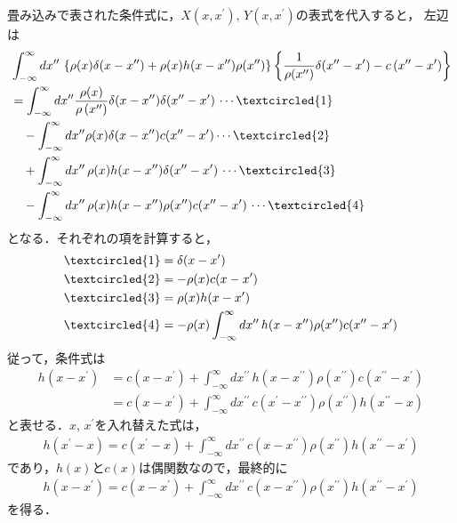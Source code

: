 \noindent
畳み込みで表された条件式に，$X\left(x,x^{\prime}\right)$, $Y\left(x,x^{\prime}\right)$の表式を代入すると，
左辺は
\begin{align*}
 &\int_{-\infty}^{\infty} dx^{\prime\prime}\,\left\{\rho(x)\delta(x-x^{\prime\prime})+\rho(x)h(x-x^{\prime\prime})\rho(x^{\prime\prime})\right\}\left\{\dfrac{1}{\rho(x^{\prime\prime})}\delta(x^{\prime\prime}-x^{\prime}) - c\left(x^{\prime\prime}-x^{\prime}\right)\right\} \notag \\
 & = \int_{-\infty}^{\infty}dx^{\prime\prime} \dfrac{\rho(x)}{\rho\left(x^{\prime\prime}\right)}\delta(x-x^{\prime\prime})\delta(x^{\prime\prime}-x^{\prime}) \,\cdots \textcircled{1}\notag \\ 
 & \quad - \int_{-\infty}^{\infty}dx^{\prime\prime}\rho(x)\delta(x-x^{\prime\prime})c(x^{\prime\prime}-x^{\prime}) 
 \cdots \textcircled{2}\notag \\
 & \quad +\int_{-\infty}^{\infty}dx^{\prime\prime}\,\rho(x)h(x-x^{\prime\prime})\delta(x^{\prime\prime}-x^{\prime})\,\cdots \textcircled{3} \notag \\
 & \quad -\int_{-\infty}^{\infty}dx^{\prime\prime}\,\rho(x)h(x-x^{\prime\prime})\rho(x^{\prime\prime})c(x^{\prime\prime}-x^{\prime}) \,\cdots \textcircled{4}
\end{align*}
となる．それぞれの項を計算すると，
\begin{align*}
 \textcircled{1} &= \delta(x-x^{\prime}) \\
 \textcircled{2} &= -\rho(x)c(x-x^{\prime}) \\
 \textcircled{3} &= \rho(x)h(x-x^{\prime}) \\
 \textcircled{4} &= -\rho(x)\int_{-\infty}^{\infty}dx^{\prime\prime}\,h(x-x^{\prime\prime})\rho(x^{\prime\prime})c(x^{\prime\prime}-x^{\prime})
\end{align*}
従って，条件式は
\begin{align*}
 h(x-x^{\prime}) &= c(x-x^{\prime}) + \int_{-\infty}^{\infty}dx^{\prime\prime}\,
                   h(x-x^{\prime\prime})\rho(x^{\prime\prime})c(x^{\prime\prime}-x^{\prime}) \\
                 &= c(x-x^{\prime}) + \int_{-\infty}^{\infty}dx^{\prime\prime}\, c(x^{\prime}-x^{\prime\prime})\rho(x^{\prime\prime})h(x^{\prime\prime}-x)
\end{align*}
と表せる．$x$, $x^{\prime}$を入れ替えた式は，
\begin{align*}
  h(x^\prime -x) = c(x^\prime - x) + \int_{-\infty}^{\infty}dx^{\prime\prime}\,c(x-x^{\prime\prime})\rho(x^{\prime\prime})h(x^{\prime\prime}-x^{\prime}) 
\end{align*}
であり，$h(x)$と$c(x)$は偶関数なので，最終的に
\begin{align*}
  h(x-x^{\prime}) = c(x-x^{\prime}) + \int_{-\infty}^{\infty}dx^{\prime\prime}\,c(x-x^{\prime\prime})\rho(x^{\prime\prime})h(x^{\prime\prime}-x^{\prime}) 
\end{align*}
を得る．